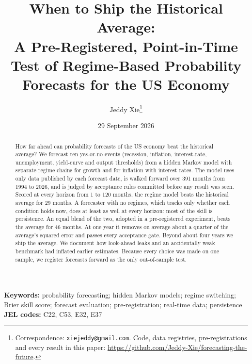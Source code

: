 \documentclass[11pt]{article}
\title{When to Ship the Historical Average:\\[2pt]
\large A Pre-Registered, Point-in-Time Test of Regime-Based Probability Forecasts for the US Economy}
\author{Jeddy Xie\thanks{Correspondence: \texttt{xiejeddy@gmail.com}. Code, data registries,
pre-registrations and every result in this paper:
\url{https://github.com/Jeddy-Xie/forecasting-the-future}.}}
\date{29 September 2026}
\begin{document}
\maketitle

\begin{abstract}
\noindent
How far ahead can probability forecasts of the US economy beat the historical average? We forecast ten
yes-or-no events (recession, inflation, interest-rate, unemployment, yield-curve and output thresholds)
from a hidden Markov model with separate regime chains for growth and for inflation with interest rates.
The model uses only data published by each forecast date, is walked forward over 391 months from 1994 to 2026, and is
judged by acceptance rules committed before any result was seen. Scored at every horizon from 1 to 120
months, the regime model beats the historical average for 29 months. A forecaster with no regimes, which
tracks only whether each condition holds now, does at least as well at every horizon: most of the skill
is persistence. An equal blend of the two, adopted in a pre-registered experiment, beats the average for
46 months. At one year it removes on average about a quarter of the average's squared error and passes
every acceptance gate. Beyond about four years we ship the average. We document how look-ahead leaks and
an accidentally weak benchmark had inflated earlier estimates. Because every choice was made on one
sample, we register forecasts forward as the only out-of-sample test.
\end{abstract}

\noindent\textbf{Keywords:} probability forecasting; hidden Markov models; regime switching; Brier skill
score; forecast evaluation; pre-registration; real-time data; persistence\\
\noindent\textbf{JEL codes:} C22, C53, E32, E37
\end{document}
